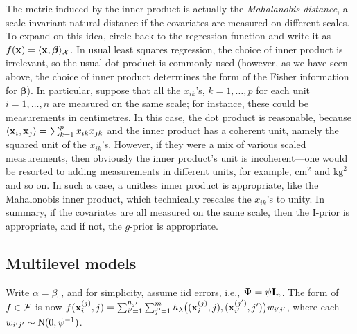 The metric induced by the inner product is actually the \emph{Mahalanobis distance}, a scale-invariant natural distance if the covariates are measured on different scales.
To expand on this idea, circle back to the regression function and write it as $f({\mathbf x}) = \langle{\mathbf x},\boldsymbol\beta\rangle_{\mathcal X}$.
In usual least squares regression, the choice of inner product is irrelevant, so the usual dot product is commonly used (however, as we have seen above, the choice of inner product determines the form of the Fisher information for $\boldsymbol{\beta}$).
In particular, suppose that all the $x_{ik}$'s, $k=1,\dots,p$ for each unit $i=1,\dots,n$ are measured on the same scale; for instance, these could be measurements in centimetres.
In this case, the dot product is reasonable, because $\langle{\mathbf x}_i,{\mathbf x}_j\rangle = \sum_{k=1}^p x_{ik}x_{jk}$ and the inner product has a coherent unit, namely the squared unit of the $x_{ik}$'s.
However, if they were a mix of various scaled measurements, then obviously the inner product's unit is incoherent---one would be resorted to adding measurements in different units, for example, $\text{cm}^2$ and $\text{kg}^2$ and so on.
In such a case, a unitless inner product is appropriate, like the Mahalonobis inner product, which technically rescales the $x_{ik}$'s to unity.
In summary, if the covariates are all measured on the same scale, then the I-prior is appropriate, and if not, the $g$-prior is appropriate.

\subsection{Multilevel models}
\label{misc:multilevelmodels}

Write $\alpha=\beta_0$, and for simplicity, assume iid errors, i.e.,  ${\bm\Psi} = \psi{\mathbf I}_n$.
The form of $f\in{\mathcal F}$ is now $f({\mathbf x}_i^{(j)},j) = \sum_{i'=1}^{n_{j'}}\sum_{j'=1}^m h_\lambda\big(({\mathbf x}_i^{(j)},j),({\mathbf x}_{i'}^{(j')},j')\big) w_{i'j'}$, where each $w_{i'j'}\sim\operatorname{N}(0,\psi^{-1})$.

